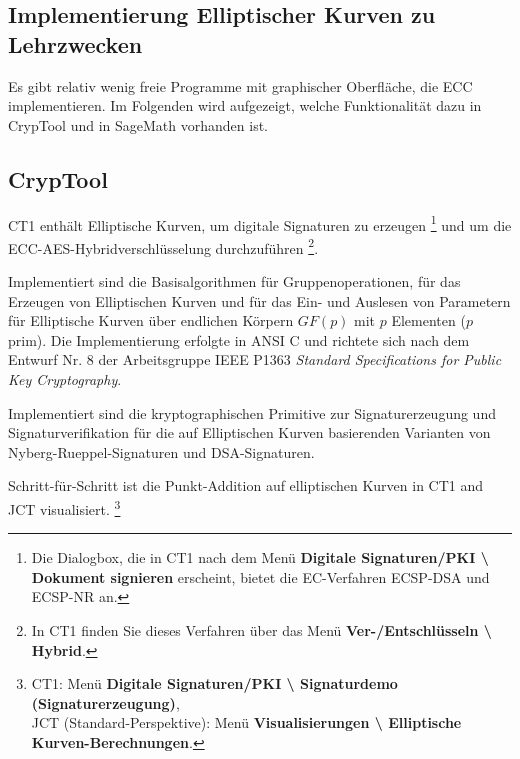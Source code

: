 \begin{refsegment}
\newpage
\section{Implementierung Elliptischer Kurven zu Lehrzwecken}
\label{ec:Implementing-for-Education}

Es gibt relativ wenig freie Programme mit graphischer Oberfläche, die ECC implementieren.
Im Folgenden wird aufgezeigt, welche Funktionalität
dazu in CrypTool und in SageMath vorhanden ist.


\subsection{CrypTool}

CT1 enthält Elliptische Kurven, um digitale Signaturen zu erzeugen%
\footnote{%
Die Dialogbox, die in CT1 nach dem Menü
\textbf{Digitale Signaturen/PKI \textbackslash{} Dokument signieren} erscheint,
bietet die EC-Verfahren ECSP-DSA und ECSP-NR an.
} und um die ECC-AES-Hybridverschlüsselung durchzuführen%
\footnote{%
In CT1 finden Sie dieses Verfahren über das Menü
\textbf{Ver-/Entschlüsseln \textbackslash{} Hybrid}.
}.

Implementiert sind die Basisalgorithmen für Gruppenoperationen, für das
Erzeugen von Elliptischen Kurven und für das Ein- und Auslesen von
Parametern für Elliptische Kurven über endlichen Körpern $GF(p)$
mit $p$ Elementen ($p$ prim). Die Implementierung erfolgte in
ANSI C und richtete sich nach dem Entwurf Nr. 8 der Arbeitsgruppe
IEEE P1363 {\em Standard Specifications for Public Key Cryptography}.

Implementiert sind die kryptographischen Primitive zur Signaturerzeugung
und Signaturverifikation für die auf Elliptischen Kurven basierenden
Varianten von Nyberg-Rueppel-Signaturen und  DSA-Signaturen.

Schritt-für-Schritt ist die Punkt-Addition auf elliptischen Kurven
in CT1 and JCT visualisiert.%
\footnote{%
  CT1: Menü \textbf{Digitale Signaturen/PKI \textbackslash{} Signaturdemo
  (Signaturerzeugung)},\\
  JCT (Standard-Perspektive): Menü \textbf{Visualisierungen \textbackslash{}
  Elliptische Kurven-Berechnungen}.
}



\end{refsegment}
